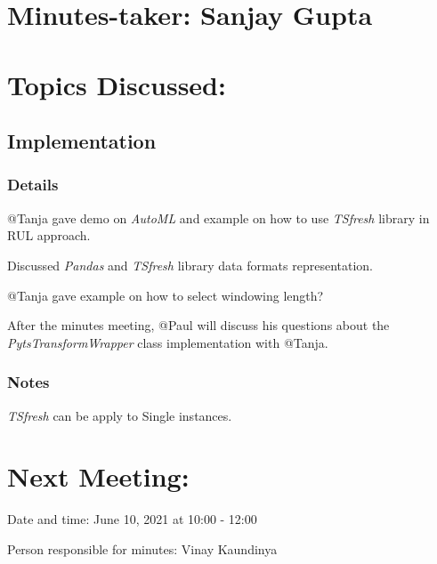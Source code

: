 \documentclass[11pt]{meetingmins} %
\begin{document}
\maketitle

\section{Minutes-taker: Sanjay Gupta}

\section{Topics Discussed:}

\subsection{Implementation}
\subsubsection{Details}
\begin{hiddensubitems}
	\item @Tanja gave demo on \textit{AutoML} and example on how to use \textit{TSfresh} library in RUL approach.
	\item Discussed \textit{Pandas} and \textit{TSfresh} library data formats representation.
	\item @Tanja gave example on how to select windowing length?
	\item After the minutes meeting, @Paul will discuss his questions about the \textit{PytsTransformWrapper} class implementation with @Tanja.
\end{hiddensubitems}
\subsubsection{Notes}
\begin{hiddensubitems}
	\item \textit{TSfresh} can be apply to Single instances.
\end{hiddensubitems}

\section{Next Meeting:}
\begin{hiddensubitems}
	\item Date and time: June 10, 2021 at 10:00 - 12:00
	\item Person responsible for minutes: Vinay Kaundinya
\end{hiddensubitems}
\end{document}
